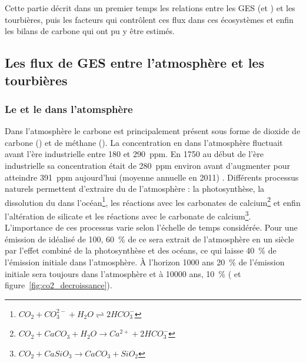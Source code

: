 
Cette partie décrit dans un premier temps les relations entre les GES (\coo et \chh) et les tourbières, puis les facteurs qui contrôlent ces flux dans ces écosystèmes et enfin les bilans de carbone qui ont pu y être estimés.

\subsection{Les flux de GES entre l'atmosphère et les tourbières}
\subsubsection{Le \coo et le \chh dans l'atomsphère}

Dans l'atmosphère le carbone est principalement présent sous forme de dioxide de carbone (\coo) et de méthane (\chh).
La concentration en \coo dans l'atmosphère fluctuait avant l'ère industrielle entre 180 et \SI{290}{ppm}.
En 1750 au début de l'ère industrielle sa concentration était de \SI{280}{ppm} environ avant d'augmenter pour atteindre \SI{391}{ppm} aujourd'hui (moyenne annuelle en 2011) \citep{Ciais2014}.
Différents processus naturels permettent d'extraire du \coo de l'atmosphère : la photosynthèse, la dissolution du \coo dans l'océan\footnote{$ CO_{2} + CO_{3}^{2-} + H_{2}O \rightleftharpoons 2HCO_{3}^{-} $}, les réactions avec les carbonates de calcium\footnote{$ CO_{2} + CaCO_{3} + H_{2}O \rightarrow Ca^{2+} + 2HCO_{3}^{-} $} et enfin l'altération de silicate et les réactions avec le carbonate de calcium\footnote{$ CO_{2} + CaSiO_{3} \rightarrow CaCO_{3} + SiO_{2} $}.
L'importance de ces processus varie selon l'échelle de temps considérée.
Pour une émission de \coo idéalisé de \SI{100}{\pgc}, \SI{60}{\percent} de ce \coo sera extrait de l'atmosphère en un siècle par l'effet combiné de la photosynthèse et des océans, ce qui laisse \SI{40}{\percent} de l'émission initiale dans l'atmosphère.
À l'horizon \num{1000} ans \SI{20}{\percent} de l'émission initiale sera toujours dans l'atmosphère et à \num{10000} ans, \SI{10}{\percent} (\citealp{joos2013,Ciais2014} et figure~\ref{fig:co2_decroissance}).
%


